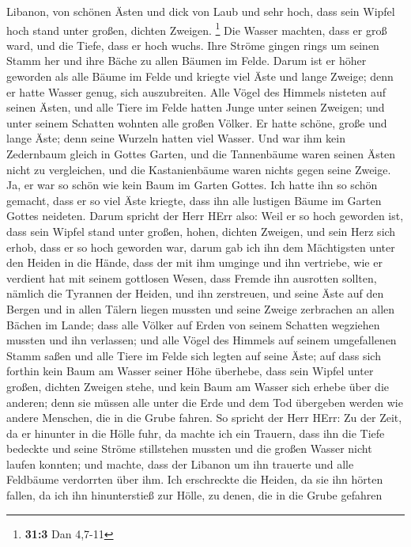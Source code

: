 Libanon, von schönen Ästen und dick von Laub und sehr hoch, dass sein
Wipfel hoch stand unter großen, dichten Zweigen. \footnote{\textbf{31:3}
  Dan 4,7-11}  Die Wasser machten, dass er groß ward, und
die Tiefe, dass er hoch wuchs. Ihre Ströme gingen rings um seinen Stamm
her und ihre Bäche zu allen Bäumen im Felde.  Darum ist er
höher geworden als alle Bäume im Felde und kriegte viel Äste und lange
Zweige; denn er hatte Wasser genug, sich auszubreiten.  Alle
Vögel des Himmels nisteten auf seinen Ästen, und alle Tiere im Felde
hatten Junge unter seinen Zweigen; und unter seinem Schatten wohnten
alle großen Völker.  Er hatte schöne, große und lange Äste;
denn seine Wurzeln hatten viel Wasser.  Und war ihm kein
Zedernbaum gleich in Gottes Garten, und die Tannenbäume waren seinen
Ästen nicht zu vergleichen, und die Kastanienbäume waren nichts gegen
seine Zweige. Ja, er war so schön wie kein Baum im Garten Gottes.
 Ich hatte ihn so schön gemacht, dass er so viel Äste
kriegte, dass ihn alle lustigen Bäume im Garten Gottes neideten.
 Darum spricht der Herr HErr also: Weil er so hoch geworden
ist, dass sein Wipfel stand unter großen, hohen, dichten Zweigen, und
sein Herz sich erhob, dass er so hoch geworden war,  darum
gab ich ihn dem Mächtigsten unter den Heiden in die Hände, dass der mit
ihm umginge und ihn vertriebe, wie er verdient hat mit seinem gottlosen
Wesen,  dass Fremde ihn ausrotten sollten, nämlich die
Tyrannen der Heiden, und ihn zerstreuen, und seine Äste auf den Bergen
und in allen Tälern liegen mussten und seine Zweige zerbrachen an allen
Bächen im Lande; dass alle Völker auf Erden von seinem Schatten
wegziehen mussten und ihn verlassen;  und alle Vögel des
Himmels auf seinem umgefallenen Stamm saßen und alle Tiere im Felde sich
legten auf seine Äste;  auf dass sich forthin kein Baum am
Wasser seiner Höhe überhebe, dass sein Wipfel unter großen, dichten
Zweigen stehe, und kein Baum am Wasser sich erhebe über die anderen;
denn sie müssen alle unter die Erde und dem Tod übergeben werden wie
andere Menschen, die in die Grube fahren.  So spricht der
Herr HErr: Zu der Zeit, da er hinunter in die Hölle fuhr, da machte ich
ein Trauern, dass ihn die Tiefe bedeckte und seine Ströme stillstehen
mussten und die großen Wasser nicht laufen konnten; und machte, dass der
Libanon um ihn trauerte und alle Feldbäume verdorrten über ihm.
 Ich erschreckte die Heiden, da sie ihn hörten fallen, da
ich ihn hinunterstieß zur Hölle, zu denen, die in die Grube gefahren
